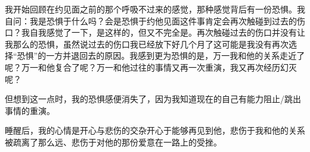 我开始回顾在约见面之前的那个呼吸不过来的感觉，那种感觉背后有一份恐惧。我自问：我是恐惧于什么吗？会是恐惧于约他见面这件事肯定会再次触碰到过去的伤口？我自我感觉了一下，是这样的，但又不完全是。再次触碰过去的伤口并没有让我那么的恐惧，虽然说过去的伤口我已经放下好几个月了\pozhehao{}这可能是我没有再次选择“恐惧”的一方并退回去的原因。我感到更为恐惧的是，万一我和他的关系走近了呢？万一和他复合了呢？万一和他过往的事情又再一次重演，我又再次经历幻灭呢？

但想到这一点时，我的恐惧感便消失了，因为我知道现在的自己有能力阻止/跳出事情的重演。

睡醒后，我的心情是开心与悲伤的交杂\pozhehao{}开心于能够再见到他，悲伤于我和他的关系被疏离了那么远、悲伤于对他的那份爱意在一路上的受挫。

